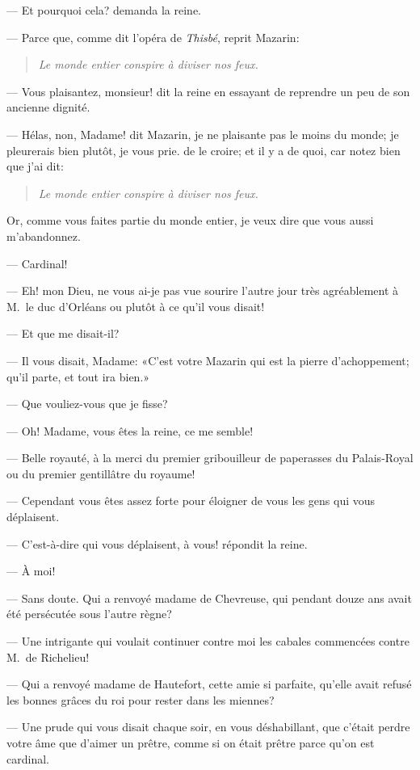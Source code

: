 — Et pourquoi cela? demanda la reine.

— Parce que, comme dit l'opéra de \textit{Thisbé}, reprit Mazarin:

\begin{quote}\itshape
	Le monde entier conspire à diviser nos feux.
\end{quote}

— Vous plaisantez, monsieur! dit la reine en essayant de reprendre un peu de son ancienne dignité.

— Hélas, non, Madame! dit Mazarin, je ne plaisante pas le moins du monde; je pleurerais bien plutôt, je vous prie. de le croire; et il y a de quoi, car notez bien que j'ai dit:

\begin{quote}\itshape
	Le monde entier conspire à diviser nos feux.
\end{quote}

Or, comme vous faites partie du monde entier, je veux dire que vous aussi m'abandonnez.

— Cardinal!

— Eh! mon Dieu, ne vous ai-je pas vue sourire l'autre jour très agréablement à M.~le duc d'Orléans ou plutôt à ce qu'il vous disait!

— Et que me disait-il?

— Il vous disait, Madame: «C'est votre Mazarin qui est la pierre d'achoppement; qu'il parte, et tout ira bien.»

— Que vouliez-vous que je fisse?

— Oh! Madame, vous êtes la reine, ce me semble!

— Belle royauté, à la merci du premier gribouilleur de paperasses du Palais-Royal ou du premier gentillâtre du royaume!

— Cependant vous êtes assez forte pour éloigner de vous les gens qui vous déplaisent.

— C'est-à-dire qui vous déplaisent, à vous! répondit la reine.

— À moi!

— Sans doute. Qui a renvoyé madame de Chevreuse, qui pendant douze ans avait été persécutée sous l'autre règne?

— Une intrigante qui voulait continuer contre moi les cabales commencées contre M.~de Richelieu!

— Qui a renvoyé madame de Hautefort, cette amie si parfaite, qu'elle avait refusé les bonnes grâces du roi pour rester dans les miennes?

— Une prude qui vous disait chaque soir, en vous déshabillant, que c'était perdre votre âme que d'aimer un prêtre, comme si on était prêtre parce qu'on est cardinal.

